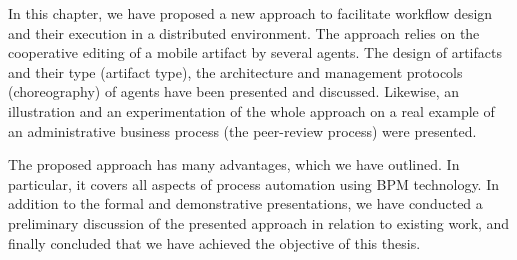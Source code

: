\label{chap3:sec:conclusion}
In this chapter, we have proposed a new approach to facilitate workflow design and their execution in a distributed environment. The approach relies on the cooperative editing of a mobile artifact by several agents.
The design of artifacts and their type (artifact type), the architecture and management protocols (choreography) of agents have been presented and discussed. Likewise, an illustration and an experimentation of the whole approach on a real example of an administrative business process (the peer-review process) were presented.

The proposed approach has many advantages, which we have outlined. In particular, it covers all aspects of process automation using BPM technology. 
In addition to the formal and demonstrative presentations, we have conducted a preliminary discussion of the presented approach in relation to existing work, and finally concluded that we have achieved the objective of this thesis.


